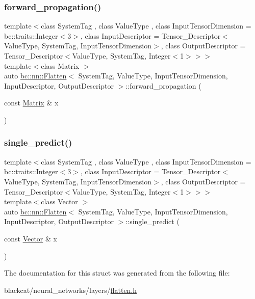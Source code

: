 \subsubsection{\texorpdfstring{forward\+\_\+propagation()}{forward\_propagation()}}
{\footnotesize\ttfamily template$<$class System\+Tag , class Value\+Type , class Input\+Tensor\+Dimension  = bc\+::traits\+::\+Integer$<$3$>$, class Input\+Descriptor  = Tensor\+\_\+\+Descriptor$<$\+Value\+Type, System\+Tag, Input\+Tensor\+Dimension$>$, class Output\+Descriptor  = Tensor\+\_\+\+Descriptor$<$\+Value\+Type, System\+Tag, Integer$<$1$>$$>$$>$ \\
template$<$class Matrix $>$ \\
auto \hyperlink{structbc_1_1nn_1_1Flatten}{bc\+::nn\+::\+Flatten}$<$ System\+Tag, Value\+Type, Input\+Tensor\+Dimension, Input\+Descriptor, Output\+Descriptor $>$\+::forward\+\_\+propagation (\begin{DoxyParamCaption}\item[{const \hyperlink{namespacebc_a92dd1e243183b382432a5fac3ed8b89f}{Matrix} \&}]{x }\end{DoxyParamCaption})\hspace{0.3cm}{\ttfamily [inline]}}

\mbox{\label{structbc_1_1nn_1_1Flatten_a0d46bfe5ed2d540c9f9ef355c1704585}} 
\subsubsection{\texorpdfstring{single\+\_\+predict()}{single\_predict()}}
{\footnotesize\ttfamily template$<$class System\+Tag , class Value\+Type , class Input\+Tensor\+Dimension  = bc\+::traits\+::\+Integer$<$3$>$, class Input\+Descriptor  = Tensor\+\_\+\+Descriptor$<$\+Value\+Type, System\+Tag, Input\+Tensor\+Dimension$>$, class Output\+Descriptor  = Tensor\+\_\+\+Descriptor$<$\+Value\+Type, System\+Tag, Integer$<$1$>$$>$$>$ \\
template$<$class Vector $>$ \\
auto \hyperlink{structbc_1_1nn_1_1Flatten}{bc\+::nn\+::\+Flatten}$<$ System\+Tag, Value\+Type, Input\+Tensor\+Dimension, Input\+Descriptor, Output\+Descriptor $>$\+::single\+\_\+predict (\begin{DoxyParamCaption}\item[{const \hyperlink{namespacebc_a14d40e8e95957f92a57853921837a15d}{Vector} \&}]{x }\end{DoxyParamCaption})\hspace{0.3cm}{\ttfamily [inline]}}



The documentation for this struct was generated from the following file\+:\begin{DoxyCompactItemize}
\item 
blackcat/neural\+\_\+networks/layers/\hyperlink{flatten_8h}{flatten.\+h}\end{DoxyCompactItemize}
